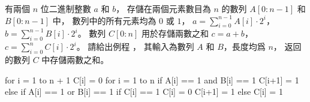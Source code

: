 \startEXERCISE
有兩個 $n$ 位二進制整數 $a$ 和 $b$，
存儲在兩個元素數目為 $n$ 的數列 $A[0:n-1]$ 和 $B[0:n-1]$ 中，
數列中的所有元素均為 $0$ 或 $1$，
$a = \sum_{i=0}^{n-1}A[i]\cdot 2^i$，
$b = \sum_{i=0}^{n-1}B[i]\cdot 2^i$。
數列 $C[0:n]$ 用於存儲兩數之和 $c=a+b$，
$c = \sum_{i=0}^{n}C[i]\cdot 2^i$。
請給出例程 ，
其輸入為數列 $A$ 和 $B$，長度均爲 $n$，
返回的數列 $C$ 中存儲兩數之和。
\stopEXERCISE
\startANSWER

\startCLRSCODE
for i = 1 to n + 1
	C[i] = 0
for i = 1 to n
	if A[i] == 1 and B[i] == 1
		C[i+1] = 1
	else if A[i] == 1 or B[i] == 1
		if C[i] == 1
			C[i] = 0
			C[i+1] = 1
		else
			C[i] = 1
\stopCLRSCODE

\stopANSWER

\stopsection
